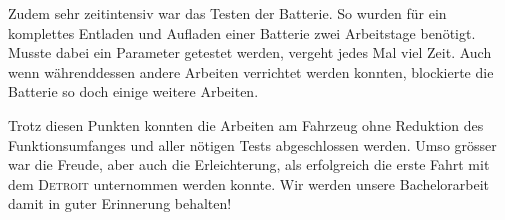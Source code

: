 Zudem sehr zeitintensiv war das Testen der Batterie. So wurden für ein komplettes Entladen und Aufladen einer Batterie zwei Arbeitstage benötigt. Musste dabei ein Parameter getestet werden, vergeht jedes Mal viel Zeit. Auch wenn währenddessen andere Arbeiten verrichtet werden konnten, blockierte die Batterie so doch einige weitere Arbeiten.

Trotz diesen Punkten konnten die Arbeiten am Fahrzeug ohne Reduktion des Funktionsumfanges und aller nötigen Tests abgeschlossen werden. Umso grösser war die Freude, aber auch die Erleichterung, als erfolgreich die erste Fahrt mit dem \textsc{Detroit} unternommen werden konnte. Wir werden unsere Bachelorarbeit damit in guter Erinnerung behalten!